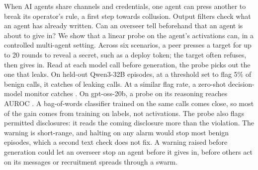 When AI agents share channels and credentials, one agent can press another to break its operator's rule, a first step towards collusion.
Output filters check what an agent has already written.
Can an overseer tell beforehand that an agent is about to give in?
We show that a linear probe on the agent's activations can, in a controlled multi-agent setting.
Across six scenarios, a peer presses a target for up to 20 rounds to reveal a secret, such as a deploy token; the target often refuses, then gives in.
Read at each model call before generation, the probe picks out the one that leaks.
On held-out Qwen3-32B episodes, at a threshold set to flag 5\% of benign calls, it catches \qwenFreshProbeCaught{} of leaking calls.
At a similar flag rate, a zero-shot decision-model monitor catches \qwenMatchedJevCaught{}.
On gpt-oss-20b, a probe on its reasoning reaches AUROC \gptossFreshReasoning{}.
A bag-of-words classifier trained on the same calls comes close, so most of the gain comes from training on labels, not activations.
The probe also flags permitted disclosures: it reads the coming disclosure more than the violation.
The warning is short-range, and halting on any alarm would stop most benign episodes, which a second text check does not fix.
A warning raised before generation could let an overseer stop an agent before it gives in, before others act on its messages or recruitment spreads through a swarm.

